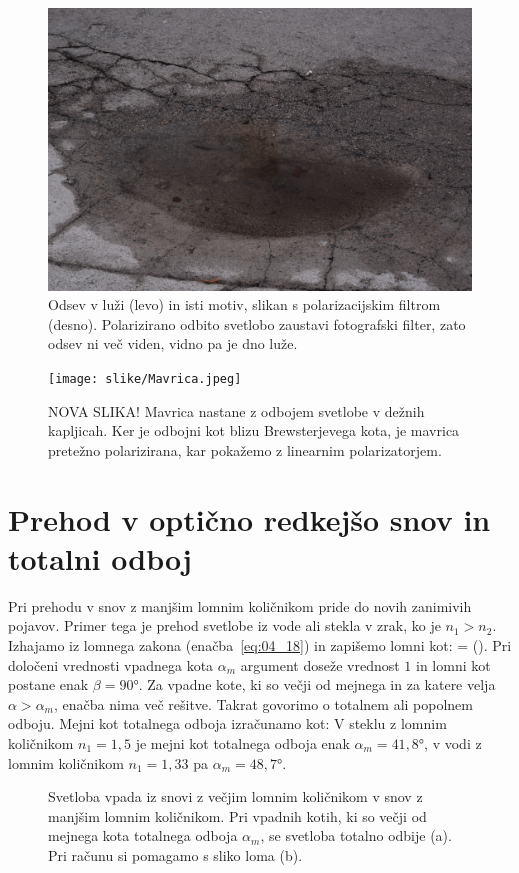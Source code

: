 \begin{remark}
\begin{figure}[!h]
\includegraphics[width=7truecm]{slike/04_photos_grad2.jpg}
\caption{Odsev v luži (levo) in isti motiv, slikan s polarizacijskim filtrom (desno). 
Polarizirano odbito svetlobo zaustavi fotografski filter, zato odsev ni več viden,
vidno pa je dno luže.}
\label{fig:04_odsevgrad}
\end{figure}
\begin{figure}[!h]
\centering
\texttt{[image: slike/Mavrica.jpeg]}
\caption{NOVA SLIKA! Mavrica nastane z odbojem svetlobe v dežnih kapljicah. Ker je odbojni
kot blizu Brewsterjevega kota, je mavrica pretežno polarizirana, kar pokažemo z linearnim 
polarizatorjem.}
\label{fig:04_MavricaFoto}
\end{figure}
\end{remark}

\section{Prehod v optično redkejšo snov in totalni odboj}
Pri prehodu v snov z manjšim lomnim količnikom pride do novih zanimivih pojavov.
Primer tega je prehod svetlobe iz vode ali stekla v zrak, ko je $n_1>n_2$.
Izhajamo iz lomnega zakona (enačba~\ref{eq:04_18}) in zapišemo lomni kot:
\beq
\beta = \arcsin \left(\sin \alpha\right)\!\!.
\label{eq:04_52}
\eeq
Pri določeni vrednosti vpadnega kota $\alpha_m$ 
argument doseže vrednost $1$ in lomni kot
postane enak $\beta = 90\si{\degree}$. Za vpadne kote, ki so večji od 
mejnega in za katere velja
$\alpha> \alpha_m$, enačba nima več rešitve. Takrat govorimo o totalnem 
ali popolnem odboju. Mejni kot totalnega odboja izračunamo kot:
V steklu z lomnim količnikom $n_1=1,5$ je mejni kot totalnega odboja
enak $\alpha_m = 41,8\si{\degree}$, v vodi z lomnim količnikom 
$n_1 = 1,33$ pa $\alpha_m = 48,7\si{\degree}$.
\begin{figure}[ht]
\centering
\def\svgwidth{140truemm} 

\caption{Svetloba vpada iz snovi z večjim lomnim količnikom v snov z manjšim lomnim količnikom.
Pri vpadnih kotih, ki so večji od mejnega kota totalnega odboja $\alpha_m$, se svetloba totalno odbije (a). Pri računu
si pomagamo s sliko loma (b).}
\label{fig:04_totalni}
\end{figure}

